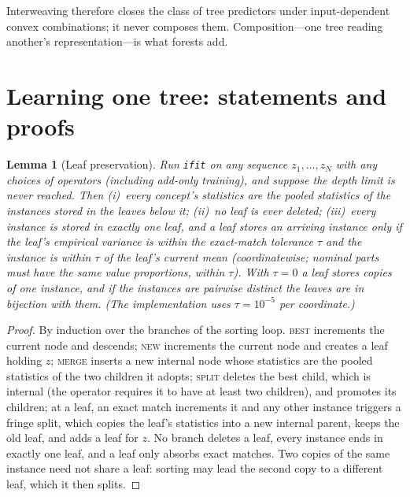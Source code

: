 \documentclass[11pt]{article}
\newtheorem{lemma}[theorem]{Lemma}
\theoremstyle{definition}
\theoremstyle{remark}
\begin{document}
Interweaving therefore closes the class of tree predictors under input-dependent
convex combinations; it never composes them.  Composition---one tree reading another's
representation---is what forests add.

\section{Learning one tree: statements and proofs}\label{sec:learn}

\begin{lemma}[Leaf preservation]\label{lem:leaves}
Run \texttt{ifit} on any sequence $z_1,\dots,z_N$ with any choices of operators
(including add-only training), and suppose the depth limit is never reached.  Then
(i)~every concept's statistics are the pooled statistics of the instances stored in the
leaves below it; (ii)~no leaf is ever deleted; (iii)~every instance is stored in exactly
one leaf, and a leaf stores an arriving instance only if the leaf's empirical variance is within the
exact-match tolerance $\tau$ and the instance is within $\tau$ of the leaf's current mean
(coordinatewise; nominal parts must have the same value proportions, within $\tau$).  With
$\tau=0$ a leaf stores copies of one instance, and if the instances are pairwise distinct
the leaves are in bijection with them.  (The implementation uses $\tau=10^{-5}$ per
coordinate.)
\end{lemma}
\begin{proof}
By induction over the branches of the sorting loop.  \textsc{best} increments the
current node and descends; \textsc{new} increments the current node and creates a leaf
holding $z$; \textsc{merge} inserts a new internal node whose statistics are the pooled
statistics of the two children it adopts; \textsc{split} deletes the best child, which is
internal (the operator requires it to have at least two children), and promotes its
children; at a leaf, an exact match increments it and any other instance triggers a
fringe split, which copies the leaf's statistics into a new internal parent, keeps the
old leaf, and adds a leaf for $z$.  No branch deletes a leaf, every instance ends in
exactly one leaf, and a leaf only absorbs exact matches.  Two copies of the same
instance need not share a leaf: sorting may lead the second copy to a different leaf,
which it then splits.
\end{proof}
\end{document}
